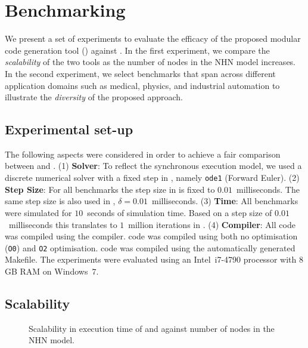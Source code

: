 \section{Benchmarking}
\label{sec:benchmarking}

We present a set of experiments to evaluate the efficacy of the proposed
modular code generation tool (\ourTool) against \simulink.  In the first 
experiment, we compare the \emph{scalability} of the two tools as the 
number of nodes in the \ac{NHN} model increases.  In the second experiment, we 
select benchmarks that span across different application domains such as 
medical, physics, and industrial automation to illustrate the \emph{diversity} 
of the proposed approach.


\subsection{Experimental set-up}
\label{sec:experimentalSetUp}
The following aspects were considered in order to achieve a fair
comparison between \ourTool and \simulink. 
(1) \textbf{Solver}: To reflect the synchronous execution model, we
  used a discrete numerical solver with a fixed step in \simulink,
  namely \texttt{ode1} (Forward Euler).
(2) 
\textbf{Step Size}: For all benchmarks the step size in \simulink
  is fixed to $0.01$~milliseconds.  The same step size is also used in
  \ourTool, $\delta = 0.01$~milliseconds.
(3) 
\textbf{Time}: All benchmarks were simulated for $10$~seconds of
  simulation time.  Based on a step size of $0.01$~milliseconds this
  translates to $1$~million iterations in \ourTool.
  (4)
\textbf{Compiler}: All code was compiled using the \compiler
  compiler.  \ourTool code was compiled using both no optimisation
  (\texttt{O0}) and \texttt{O2} optimisation.  \simulink code was
  compiled using the automatically generated Makefile.
The experiments were evaluated using an Intel~i7-4790 processor with
$8$\,GB RAM on Windows~$7$.


\subsection{Scalability}

\begin{figure}[htbp]
  \centering
  
  \setlength{\abovecaptionskip}{-10pt}
  \caption{Scalability in  execution time of \simulink and 
  \ourTool against number of nodes in the \acf{NHN} model.}
  \label{fig:scalability}
\end{figure}

